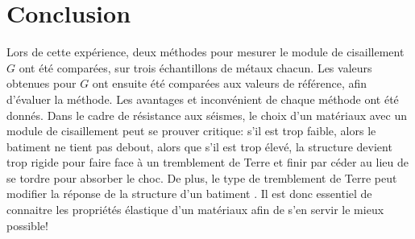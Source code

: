 \section{Conclusion}

Lors de cette expérience, deux méthodes pour mesurer le module de cisaillement $G$ ont été comparées, sur trois échantillons de métaux chacun. Les valeurs obtenues pour $G$ ont ensuite été comparées aux valeurs de référence, afin d'évaluer la méthode. Les avantages et inconvénient de chaque méthode ont été donnés. Dans le cadre de résistance aux séismes, le choix d'un matériaux avec un module de cisaillement peut se prouver critique: s'il est trop faible, alors le batiment ne tient pas debout, alors que s'il est trop élevé, la structure devient trop rigide pour faire face à un tremblement de Terre et finir par céder au lieu de se tordre pour absorber le choc. De plus, le type de tremblement de Terre peut modifier la réponse de la structure d'un batiment \cite{japan_shaky_stiffness}. Il est donc essentiel de connaitre les propriétés élastique d'un matériaux afin de s'en servir le mieux possible!